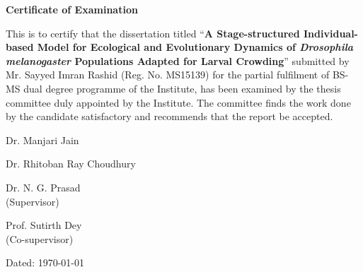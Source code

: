 \begin{center}
\Large  {\bf Certificate of Examination}
\end{center}
\vspace{1in}
This is to certify that the dissertation titled “\textbf{A Stage-structured Individual-based Model for Ecological and Evolutionary Dynamics of \textit{Drosophila melanogaster} Populations Adapted for Larval Crowding}” submitted by Mr. Sayyed Imran Rashid (Reg. No. MS15139) for the partial fulfilment of BS-MS dual degree programme of the Institute, has been examined by the thesis committee duly appointed by the Institute. The committee finds the work done by the candidate satisfactory and recommends that the report be accepted.

\vspace{1in}
\begin{center}
\parbox[t]{0.24\textwidth}{
    \centering
    Dr. Manjari Jain}
\parbox[t]{0.24\textwidth}{
    \centering
    Dr. Rhitoban Ray Choudhury}
\parbox[t]{0.24\textwidth}{
    \centering
    Dr. N. G. Prasad\\
    (Supervisor)}
\parbox[t]{0.24\textwidth}{
    \centering
    Prof. Sutirth Dey\\
    (Co-supervisor)}
\end{center}
\vspace{0.5in}
\begin{flushright}
Dated: \today
\end{flushright}
\vfill
\cleardoublepage

